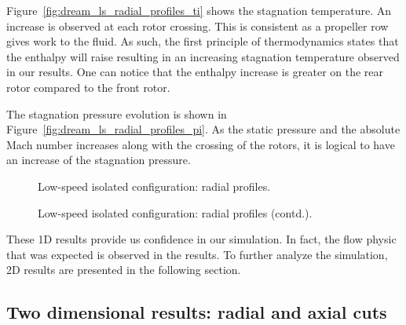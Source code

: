 Figure~\ref{fig:dream_ls_radial_profiles_ti}
shows the stagnation temperature.
An increase is observed at each 
rotor crossing. This is consistent as
a propeller row gives work to the fluid. As such,
the first principle of thermodynamics states that the 
enthalpy will raise resulting in an increasing stagnation
temperature observed in our results. One can notice that
the enthalpy increase is greater on the rear rotor compared
to the front rotor.

The stagnation pressure evolution is shown in 
Figure~\ref{fig:dream_ls_radial_profiles_pi}. As the static pressure
and the absolute Mach number increases along with the crossing of the rotors,
it is logical to have an increase of the stagnation pressure.
\begin{figure}[htp]
  \centering
  \caption{Low-speed isolated configuration: radial profiles.}
\end{figure}
\begin{figure}[htp]
  \centering
  \setcounter{subfigure}{3}
  \caption{Low-speed isolated configuration: radial profiles (contd.).}
  \label{fig:dream_ls_radial_profiles}
\end{figure}

These 1D results provide us confidence in our simulation. 
In fact, the flow physic that
was expected is observed in the results. To further analyze the simulation,
2D results are presented in the following section.

\subsection{Two dimensional results: radial and axial cuts}
\label{sub:dream_ls_flow_field}

